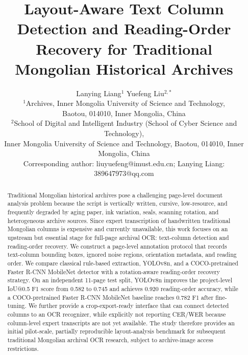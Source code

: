 \documentclass[12pt]{article}
\begin{document}
\title{Layout-Aware Text Column Detection and Reading-Order Recovery for Traditional Mongolian Historical Archives}

\author{\parbox{0.95\textwidth}{\centering Lanying Liang$^{1}$ \quad Yuefeng Liu$^{2,*}$\\[0.4em]\small $^{1}$Archives, Inner Mongolia University of Science and Technology,\\\small Baotou, 014010, Inner Mongolia, China\\\small $^{2}$School of Digital and Intelligent Industry (School of Cyber Science and Technology),\\\small Inner Mongolia University of Science and Technology, Baotou, 014010, Inner Mongolia, China\\\small *Corresponding author: liuyuefeng@imust.edu.cn; Lanying Liang: 389647973@qq.com}}
\date{}
\maketitle

\begin{abstract}
Traditional Mongolian historical archives pose a challenging page-level document analysis problem because the script is vertically written, cursive, low-resource, and frequently degraded by aging paper, ink variation, seals, scanning rotation, and heterogeneous archive sources. Since expert transcription of handwritten traditional Mongolian columns is expensive and currently unavailable, this work focuses on an upstream but essential stage for full-page archival OCR: text-column detection and reading-order recovery. We construct a page-level annotation protocol that records text-column bounding boxes, ignored noise regions, orientation metadata, and reading order. We compare classical rule-based extraction, YOLOv8n, and a COCO-pretrained Faster R-CNN MobileNet detector with a rotation-aware reading-order recovery strategy. On an independent 11-page test split, YOLOv8n improves the project-level IoU@0.5 F1 score from 0.582 to 0.745 and achieves 0.920 reading-order accuracy, while a COCO-pretrained Faster R-CNN MobileNet baseline reaches 0.782 F1 after fine-tuning. We further provide a crop-export-ready interface that can connect detected columns to an OCR recognizer, while explicitly not reporting CER/WER because column-level expert transcripts are not yet available. The study therefore provides an initial pilot-scale, partially reproducible layout-analysis benchmark for subsequent traditional Mongolian archival OCR research, subject to archive-image access restrictions.
\end{abstract}
\end{document}
